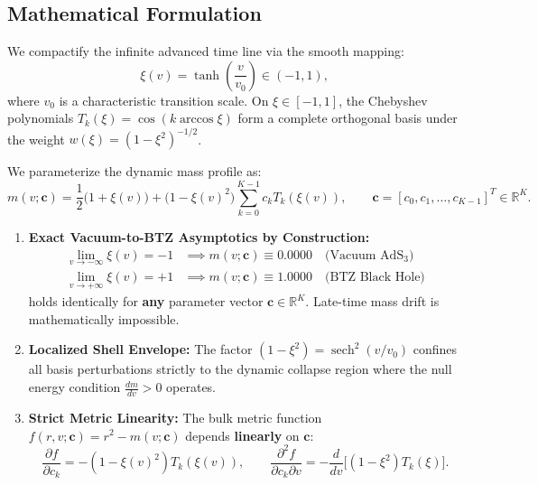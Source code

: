 \documentclass[11pt,a4paper]{article}
\begin{document}
\subsection{Mathematical Formulation}
We compactify the infinite advanced time line via the smooth mapping:
\begin{equation}
    \xi(v) = \tanh\left(\frac{v}{v_0}\right) \in (-1, 1),
\end{equation}
where $v_0$ is a characteristic transition scale. On $\xi \in [-1, 1]$, the Chebyshev polynomials $T_k(\xi) = \cos(k \arccos \xi)$ form a complete orthogonal basis under the weight $w(\xi) = (1 - \xi^2)^{-1/2}$.

We parameterize the dynamic mass profile as:
\begin{equation}
    m(v; \mathbf{c}) = \frac{1}{2}\big(1 + \xi(v)\big) + \big(1 - \xi(v)^2\big) \sum_{k=0}^{K-1} c_k T_k(\xi(v)), \qquad \mathbf{c} = [c_0, c_1, \dots, c_{K-1}]^T \in \mathbb{R}^K.
    \label{eq:chebyshev_mass}
\end{equation}

\begin{summarybox}
\begin{enumerate}
    \item \textbf{Exact Vacuum-to-BTZ Asymptotics by Construction:}
    \begin{align}
        \lim_{v \to -\infty} \xi(v) = -1 &\implies m(v; \mathbf{c}) \equiv 0.0000 \quad \text{(Vacuum $\mathrm{AdS}_3$)} \\
        \lim_{v \to +\infty} \xi(v) = +1 &\implies m(v; \mathbf{c}) \equiv 1.0000 \quad \text{(BTZ Black Hole)}
    \end{align}
    holds identically for \textbf{any} parameter vector $\mathbf{c} \in \mathbb{R}^K$. Late-time mass drift is mathematically impossible.
    \item \textbf{Localized Shell Envelope:} The factor $(1 - \xi^2) = \operatorname{sech}^2(v/v_0)$ confines all basis perturbations strictly to the dynamic collapse region where the null energy condition $\frac{dm}{dv} > 0$ operates.
    \item \textbf{Strict Metric Linearity:} The bulk metric function $f(r, v; \mathbf{c}) = r^2 - m(v; \mathbf{c})$ depends \textbf{linearly} on $\mathbf{c}$:
    \begin{equation}
        \frac{\partial f}{\partial c_k} = -(1 - \xi(v)^2) T_k(\xi(v)), \qquad \frac{\partial^2 f}{\partial c_k \partial v} = -\frac{d}{dv}\big[(1 - \xi^2) T_k(\xi)\big].
    \end{equation}
\end{enumerate}
\end{summarybox}
\end{document}
